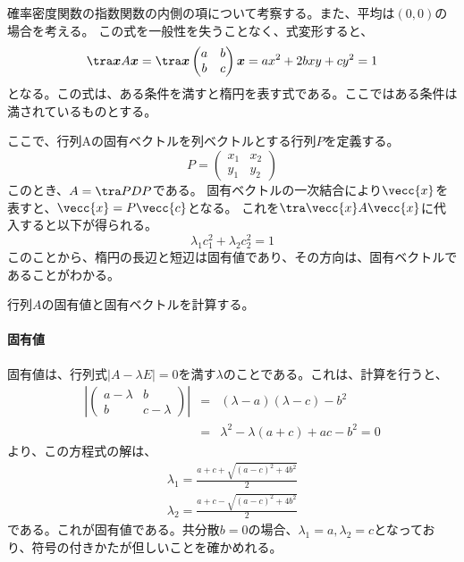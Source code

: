 確率密度関数の指数関数の内側の項について考察する。また、平均は$(0,0)$の場合を考える。
この式を一般性を失うことなく、式変形すると、
\begin{equation*}
 \tra \bm{x}A\bm{x}=
 \tra \bm{x}\begin{pmatrix}
  a & b \\
  b & c 
 \end{pmatrix}\bm{x}= ax^2+2bxy+cy^2 = 1
\end{equation*}
となる。この式は、ある条件を満すと楕円を表す式である。ここではある条件は満されているものとする。



ここで、行列Aの固有ベクトルを列ベクトルとする行列$P$を定義する。
\begin{equation*}
 P = \begin{pmatrix}
      x_1 & x_2\\
      y_1 & y_2
     \end{pmatrix}
\end{equation*}
このとき、$A=\tra PDP$である。
固有ベクトルの一次結合により$\vecc{x}$を表すと、$\vecc{x}=P\vecc{c}$となる。
これを$\tra \vecc{x}A\vecc{x}$に代入すると以下が得られる。
\begin{equation*}
 \lambda_1 c_1^2+\lambda_2 c_2^2=1
\end{equation*}
このことから、楕円の長辺と短辺は固有値であり、その方向は、固有ベクトルであることがわかる。



行列$A$の固有値と固有ベクトルを計算する。
\paragraph{固有値}
固有値は、行列式$|A-\lambda E|=0$を満す$\lambda$のことである。これは、計算を行うと、
\begin{eqnarray*}
 \left|\begin{pmatrix}
  a-\lambda & b\\
  b & c-\lambda
  \end{pmatrix}\right| &=& (\lambda-a)(\lambda -c)-b^2 \\
 &=& \lambda^2-\lambda(a+c)+ac-b^2 =0
\end{eqnarray*}
より、この方程式の解は、
\begin{eqnarray*}
 \lambda_1 = \frac{a+c+\sqrt{(a-c)^2+4b^2}}{2} \\
 \lambda_2 = \frac{a+c-\sqrt{(a-c)^2+4b^2}}{2}
\end{eqnarray*}
である。これが固有値である。共分散$b=0$の場合、$\lambda_1=a,\lambda_2=c$となっており、符号の付きかたが但しいことを確かめれる。

